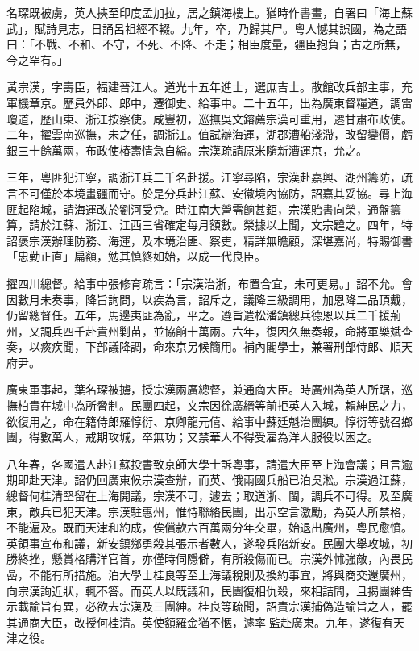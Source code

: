 \begin{pinyinscope}
名琛既被虜，英人挾至印度孟加拉，居之鎮海樓上。猶時作書畫，自署曰「海上蘇武」，賦詩見志，日誦呂祖經不輟。九年，卒，乃歸其尸。粵人憾其誤國，為之語曰：「不戰、不和、不守，不死、不降、不走；相臣度量，疆臣抱負；古之所無，今之罕有。」

黃宗漢，字壽臣，福建晉江人。道光十五年進士，選庶吉士。散館改兵部主事，充軍機章京。歷員外郎、郎中，遷御史、給事中。二十五年，出為廣東督糧道，調雷瓊道，歷山東、浙江按察使。咸豐初，巡撫吳文鎔薦宗漢可重用，遷甘肅布政使。二年，擢雲南巡撫，未之任，調浙江。值試辦海運，湖郡漕船淺滯，改留變價，虧銀三十餘萬兩，布政使椿壽情急自縊。宗漢疏請原米隨新漕運京，允之。

三年，粵匪犯江寧，調浙江兵二千名赴援。江寧尋陷，宗漢赴嘉興、湖州籌防，疏言不可僅於本境畫疆而守。於是分兵赴江蘇、安徽境內協防，詔嘉其妥協。尋上海匪起陷城，請海運改於劉河受兌。時江南大營需餉甚鉅，宗漢貽書向榮，通盤籌算，請於江蘇、浙江、江西三省確定每月額數。榮據以上聞，文宗韙之。四年，特詔褒宗漢辦理防務、海運，及本境治匪、察吏，精詳無瞻顧，深堪嘉尚，特賜御書「忠勤正直」扁額，勉其慎終如始，以成一代良臣。

擢四川總督。給事中張修育疏言：「宗漢治浙，布置合宜，未可更易。」詔不允。會因數月未奏事，降旨詢問，以疾為言，詔斥之，議降三級調用，加恩降二品頂戴，仍留總督任。五年，馬邊夷匪為亂，平之。遵旨遣松潘鎮總兵德恩以兵二千援荊州，又調兵四千赴貴州剿苗，並協餉十萬兩。六年，復因久無奏報，命將軍樂斌查奏，以痰疾聞，下部議降調，命來京另候簡用。補內閣學士，兼署刑部侍郎、順天府尹。

廣東軍事起，葉名琛被擄，授宗漢兩廣總督，兼通商大臣。時廣州為英人所踞，巡撫柏貴在城中為所脅制。民團四起，文宗因徐廣縉等前拒英人入城，賴紳民之力，欲復用之，命在籍侍郎羅惇衍、京卿龍元僖、給事中蘇廷魁治團練。惇衍等號召鄉團，得數萬人，戒期攻城，卒無功；又禁華人不得受雇為洋人服役以困之。

八年春，各國遣人赴江蘇投書致京師大學士訴粵事，請遣大臣至上海會議；且言逾期即赴天津。詔仍回廣東候宗漢查辦，而英、俄兩國兵船已泊吳淞。宗漢過江蘇，總督何桂清堅留在上海開議，宗漢不可，遽去；取道浙、閩，調兵不可得。及至廣東，敵兵已犯天津。宗漢駐惠州，惟恃聯絡民團，出示空言激勵，為英人所禁格，不能遍及。既而天津和約成，俟償款六百萬兩分年交畢，始退出廣州，粵民愈憤。英領事宣布和議，新安鎮鄉勇殺其張示者數人，遂發兵陷新安。民團大舉攻城，初勝終挫，懸賞格購洋官首，亦僅時伺隱僻，有所殺傷而已。宗漢外怵強敵，內畏民嵒，不能有所措施。泊大學士桂良等至上海議稅則及換約事宜，將與商交還廣州，向宗漢詢近狀，輒不答。而英人以既議和，民團復相仇殺，來相詰問，且揭團紳告示載諭旨有異，必欲去宗漢及三團紳。桂良等疏聞，詔責宗漢捕偽造諭旨之人，罷其通商大臣，改授何桂清。英使額羅金猶不愜，遽率監赴廣東。九年，遂復有天津之役。


\end{pinyinscope}
